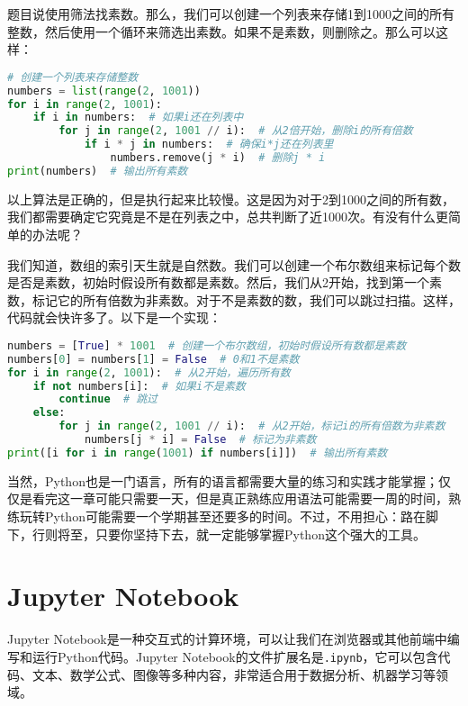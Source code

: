 \begin{answer}
  题目说使用筛法找素数。那么，我们可以创建一个列表来存储1到1000之间的所有整数，然后使用一个循环来筛选出素数。如果不是素数，则删除之。那么可以这样：

\begin{lstlisting}[language=python]
# 创建一个列表来存储整数
numbers = list(range(2, 1001))
for i in range(2, 1001):
    if i in numbers:  # 如果i还在列表中
        for j in range(2, 1001 // i):  # 从2倍开始，删除i的所有倍数
            if i * j in numbers:  # 确保i*j还在列表里
                numbers.remove(j * i)  # 删除j * i
print(numbers)  # 输出所有素数
\end{lstlisting}

  以上算法是正确的，但是执行起来比较慢。这是因为对于2到1000之间的所有数，我们都需要确定它究竟是不是在列表之中，总共判断了近1000次。有没有什么更简单的办法呢？

  我们知道，数组的索引天生就是自然数。我们可以创建一个布尔数组来标记每个数是否是素数，初始时假设所有数都是素数。然后，我们从2开始，找到第一个素数，标记它的所有倍数为非素数。对于不是素数的数，我们可以跳过扫描。这样，代码就会快许多了。以下是一个实现：

\begin{lstlisting}[language=python]
numbers = [True] * 1001  # 创建一个布尔数组，初始时假设所有数都是素数
numbers[0] = numbers[1] = False  # 0和1不是素数
for i in range(2, 1001):  # 从2开始，遍历所有数
    if not numbers[i]:  # 如果i不是素数
        continue  # 跳过
    else:
        for j in range(2, 1001 // i):  # 从2开始，标记i的所有倍数为非素数
            numbers[j * i] = False  # 标记为非素数
print([i for i in range(1001) if numbers[i]])  # 输出所有素数
\end{lstlisting}
\end{answer}

当然，Python也是一门语言，所有的语言都需要大量的练习和实践才能掌握；仅仅是看完这一章可能只需要一天，但是真正熟练应用语法可能需要一周的时间，熟练玩转Python可能需要一个学期甚至还要多的时间。不过，不用担心：路在脚下，行则将至，只要你坚持下去，就一定能够掌握Python这个强大的工具。

\section{Jupyter Notebook}

Jupyter Notebook是一种交互式的计算环境，可以让我们在浏览器或其他前端中编写和运行Python代码。Jupyter Notebook的文件扩展名是\texttt{.ipynb}，它可以包含代码、文本、数学公式、图像等多种内容，非常适合用于数据分析、机器学习等领域。

